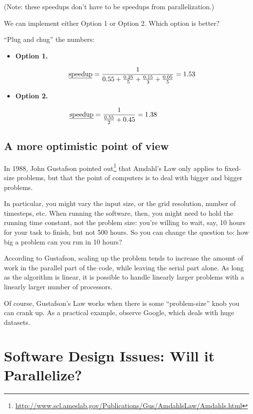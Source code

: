      (Note: these speedups don't have to be speedups from parallelization.)
    
   We can implement either Option 1 or Option 2. 
   Which option is better?

   ``Plug and chug'' the numbers:
 \begin{itemize}
 \item  {\bf Option 1.}

   \[ \mbox{\em speedup} = \frac{1}{0.55 + \frac{0.25}{5} + \frac{0.15}{3} + \frac{0.05}{5}}
     = 1.53  \]

 \item  {\bf Option 2.}

   \[\mbox{\em speedup} = \frac{1}{\frac{0.55}{2} + 0.45} = 1.38 \hspace*{5.5em}\]
\end{itemize}

\subsection*{A more optimistic point of view}
In 1988, John Gustafson pointed
out\footnote{\url{http://www.scl.ameslab.gov/Publications/Gus/AmdahlsLaw/Amdahls.html}}
that Amdahl's Law only applies to fixed-size problems, but that the
point of computers is to deal with bigger and bigger problems.

In particular, you might vary the input size, or the grid resolution,
number of timesteps, etc. When running the software, then, you might
need to hold the running time constant, not the problem size: you're
willing to wait, say, 10 hours for your task to finish, but not 500
hours. So you can change the question to: how big a problem can you
run in 10 hours?

According to Gustafson, scaling up the problem tends to increase the
amount of work in the parallel part of the code, while leaving the
serial part alone. As long as the algorithm is linear, it is possible
to handle linearly larger problems with a linearly larger number of
processors.

Of course, Gustafson's Law works when there is some ``problem-size''
knob you can crank up.  As a practical example, observe Google, which
deals with huge datasets.


\section*{Software Design Issues: Will it Parallelize?}


